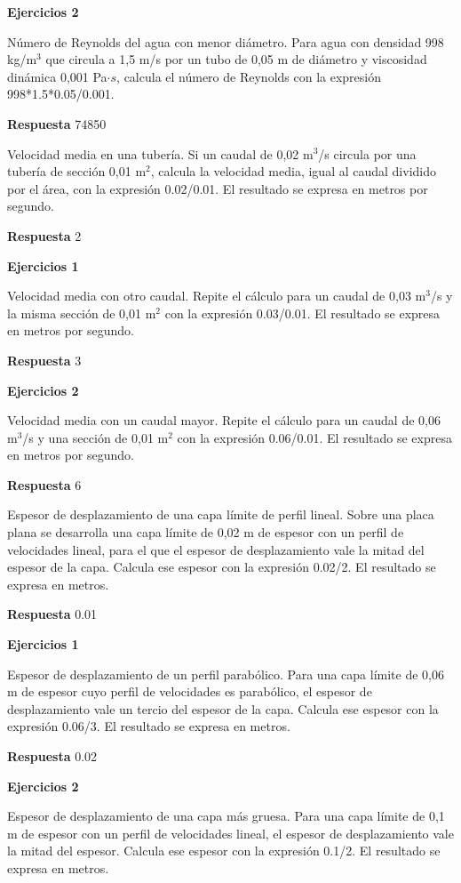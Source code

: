 \documentclass{book}
\begin{document}
\noindent\textbf{Ejercicios 2}

Número de Reynolds del agua con menor diámetro. Para agua con densidad 998 kg/m\(^{3}\) que circula a 1,5 m/s por un tubo de 0,05 m de diámetro y viscosidad dinámica 0,001 Pa\(\cdot s\), calcula el número de Reynolds con la expresión 998*1.5*0.05/0.001.

\noindent\textbf{Respuesta} 74850

Velocidad media en una tubería. Si un caudal de 0,02 m\(^{3}\)/s circula por una tubería de sección 0,01 m\(^{2}\), calcula la velocidad media, igual al caudal dividido por el área, con la expresión 0.02/0.01. El resultado se expresa en metros por segundo.

\noindent\textbf{Respuesta} 2

\noindent\textbf{Ejercicios 1}

Velocidad media con otro caudal. Repite el cálculo para un caudal de 0,03 m\(^{3}\)/s y la misma sección de 0,01 m\(^{2}\) con la expresión 0.03/0.01. El resultado se expresa en metros por segundo.

\noindent\textbf{Respuesta} 3

\noindent\textbf{Ejercicios 2}

Velocidad media con un caudal mayor. Repite el cálculo para un caudal de 0,06 m\(^{3}\)/s y una sección de 0,01 m\(^{2}\) con la expresión 0.06/0.01. El resultado se expresa en metros por segundo.

\noindent\textbf{Respuesta} 6

Espesor de desplazamiento de una capa límite de perfil lineal. Sobre una placa plana se desarrolla una capa límite de 0,02 m de espesor con un perfil de velocidades lineal, para el que el espesor de desplazamiento vale la mitad del espesor de la capa. Calcula ese espesor con la expresión 0.02/2. El resultado se expresa en metros.

\noindent\textbf{Respuesta} 0.01

\noindent\textbf{Ejercicios 1}

Espesor de desplazamiento de un perfil parabólico. Para una capa límite de 0,06 m de espesor cuyo perfil de velocidades es parabólico, el espesor de desplazamiento vale un tercio del espesor de la capa. Calcula ese espesor con la expresión 0.06/3. El resultado se expresa en metros.

\noindent\textbf{Respuesta} 0.02

\noindent\textbf{Ejercicios 2}

Espesor de desplazamiento de una capa más gruesa. Para una capa límite de 0,1 m de espesor con un perfil de velocidades lineal, el espesor de desplazamiento vale la mitad del espesor. Calcula ese espesor con la expresión 0.1/2. El resultado se expresa en metros.
\end{document}
